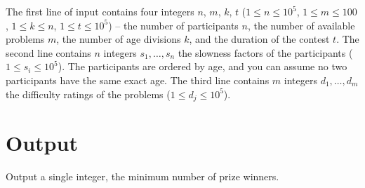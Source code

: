 The first line of input contains four integers $n$, $m$, $k$, $t$ ($1 \leq n \leq 10^5$, $1 \leq m \leq 100$, $1 \leq k \leq n$, $1 \leq t \leq 10^5$) -- the number of participants $n$,
the number of available problems $m$, the number of age divisions $k$, and the duration of the contest $t$.
The second line contains $n$ integers $s_1, \ldots, s_n$ the slowness factors of the participants ($1 \leq s_i \leq 10^5$).
The participants are ordered by age, and you can assume no two participants have the same exact age.
The third line contains $m$ integers $d_1, \ldots, d_m$ the difficulty ratings of the problems ($1 \leq d_j \leq 10^5$).

\section*{Output}

Output a single integer, the minimum number of prize winners.
